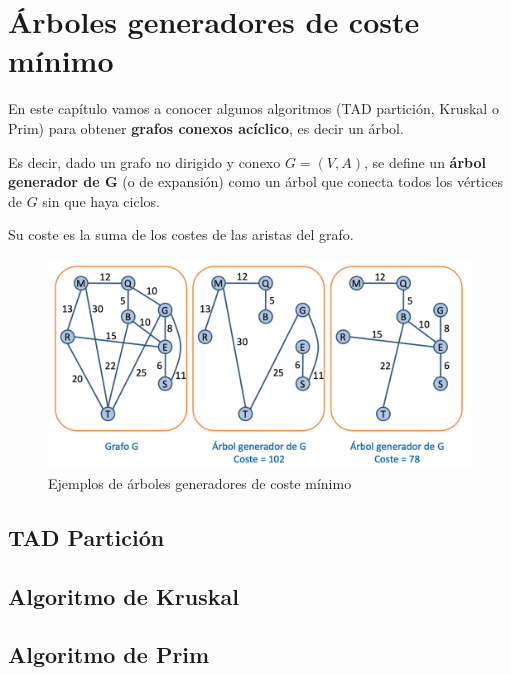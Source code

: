 \chapter{Árboles generadores de coste mínimo}
En este capítulo vamos a conocer algunos algoritmos (TAD partición, Kruskal o Prim) para obtener \textbf{grafos conexos acíclico}, es decir un árbol.

Es decir, dado un grafo no dirigido y conexo \(G = (V,A)\), se define un \textbf{árbol generador de G} (o de expansión) como un árbol que conecta todos los vértices de \(G\) sin que haya ciclos.

Su coste es la suma de los costes de las aristas del grafo.
\begin{figure}[h]
  \begin{center}
    \includegraphics[width=.7\textwidth]{assets/AGCM.png}
  \end{center}
  \caption{Ejemplos de árboles generadores de coste mínimo}
\end{figure}

\section{TAD Partición}

\section{Algoritmo de Kruskal}

\section{Algoritmo de Prim}
